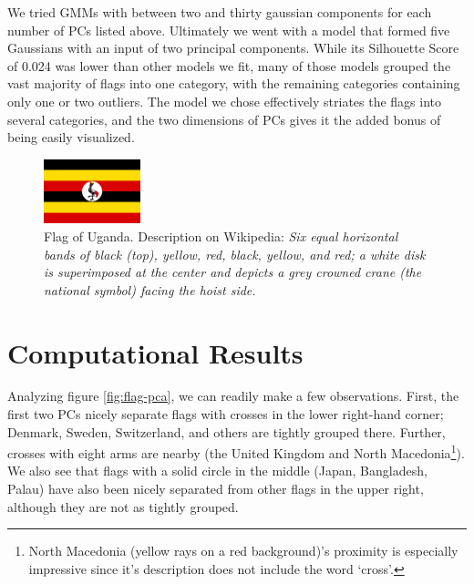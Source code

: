 \documentclass[11pt]{amsart}
\begin{document}
We tried GMMs with between two and thirty gaussian components for each number of
PCs listed above. Ultimately we went with a model that formed five Gaussians
with an input of two principal components. While its Silhouette Score of 0.024
was lower than other models we fit, many of those models grouped the vast
majority of flags into one category, with the remaining categories containing
only one or two outliers. The model we chose effectively striates the flags into
several categories, and the two dimensions of PCs gives it the added bonus of
being easily visualized.

\begin{figure}[!ht]
    \centering
    \includegraphics[width=0.25\textwidth]{./res/Flag_of_Uganda.svg.png}
    \caption{Flag of Uganda. Description on Wikipedia: \emph{Six equal horizontal bands of black (top), yellow, red, black, yellow, and red; a white disk is superimposed at the center and depicts a grey crowned crane (the national symbol) facing the hoist side. } \label{fig:uganda}}
\end{figure}

\section{Computational Results}\label{sec:results}

Analyzing figure \ref{fig:flag-pca}, we can readily make a few observations. First, the first two PCs nicely separate flags with crosses in the lower right-hand corner; Denmark, Sweden, Switzerland, and others are tightly grouped there. Further, crosses with eight arms are nearby (the United Kingdom and North Macedonia\footnote{North Macedonia (yellow rays on a red background)'s proximity is especially impressive since it's description does not include the word `cross'.}). We also see that flags with a solid circle in the middle (Japan, Bangladesh, Palau) have also been nicely separated from other flags in the upper right, although they are not as tightly grouped. 
\end{document}
